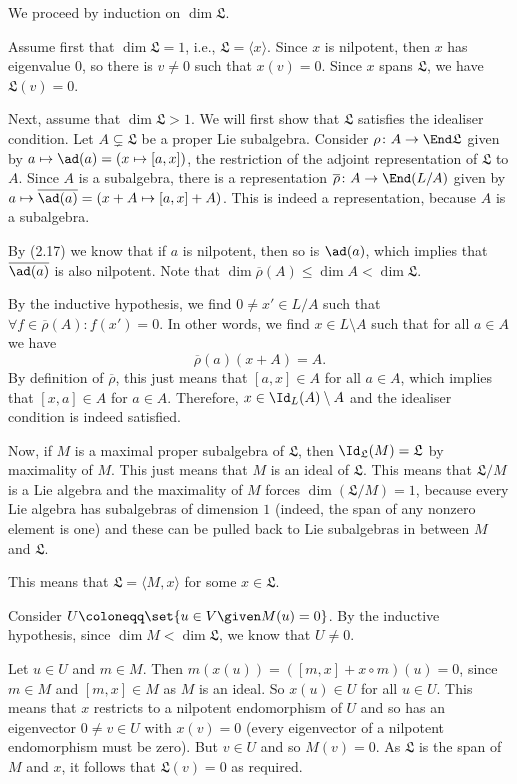 We proceed by induction on $\dim \mathfrak{L}$.

Assume first that $\dim \mathfrak{L} = 1$, i.e., $\mathfrak{L} = \langle x\rangle$.
Since $x$ is nilpotent, then $x$ has eigenvalue $0$, so there is $v\neq 0$ such that
$x(v) = 0$. Since $x$ spans $\mathfrak{L}$, we have $\mathfrak{L}(v) = 0$.

Next, assume that $\dim \mathfrak{L} > 1$. We will first show that $\mathfrak{L}$
satisfies the idealiser condition. Let $A \subsetneq \mathfrak{L}$ be a proper
Lie subalgebra. Consider $\rho\colon A\to \End \mathfrak{L}$ given by
$a\mapsto \ad(a) = (x \mapsto [a, x])$, the restriction of the adjoint representation
of $\mathfrak{L}$ to $A$. Since $A$ is a subalgebra, there is a representation
$\overline{\rho}\colon A\to \End(L/A)$ given by $a\mapsto \overline{\ad(a)} = (x + A\mapsto [a, x] + A)$.
This is indeed a representation, because $A$ is a subalgebra.

By (2.17) we know that if $a$ is nilpotent, then so is $\ad(a)$, which implies that
$\overline{\ad(a)}$ is also nilpotent. Note that $\dim \overline{\rho}(A)\leq\dim A<\dim \mathfrak{L}$.

By the inductive hypothesis, we find $0 \neq x' \in L/A$ such that
$\forall f \in \overline{\rho}(A)\colon f(x') = 0$. In other words, we find
$x \in L\setminus A$ such that for all $a \in A$ we have
\[ \overline{\rho}(a)(x + A) = A. \]
By definition of $\overline{\rho}$, this just means that $[a, x] \in A$
for all $a \in A$, which implies that $[x, a] \in A$ for $a \in A$.
Therefore, $x \in \Id_L(A) \setminus A$ and the idealiser condition is indeed
satisfied.

Now, if $M$ is a maximal proper subalgebra of $\mathfrak{L}$, then
$\Id_{\mathfrak{L}}(M) = \mathfrak{L}$ by maximality of $M$. This just means
that $M$ is an ideal of $\mathfrak{L}$. This means that $\mathfrak{L}/M$ is a Lie
algebra and the maximality of $M$ forces $\dim(\mathfrak{L}/M) = 1$, because every
Lie algebra has subalgebras of dimension $1$ (indeed, the span of any nonzero element
is one) and these can be pulled back to Lie subalgebras in between $M$ and $\mathfrak{L}$.

This means that $\mathfrak{L} = \langle M, x\rangle$ for some $x \in \mathfrak{L}$.

Consider $U\coloneqq \set{u \in V\given M(u) = 0}$. By the inductive hypothesis,
since $\dim M < \dim \mathfrak{L}$, we know that $U\neq 0$.

Let $u \in U$ and $m \in M$. Then $m(x(u)) = ([m, x] + x \circ m)(u) = 0$, since
$m \in M$ and $[m, x] \in M$ as $M$ is an ideal.
So $x(u) \in U$ for all $u \in U$. This means that $x$ restricts to a nilpotent endomorphism
of $U$ and so has an eigenvector $0\neq v \in U$ with $x(v) = 0$ (every eigenvector
of a nilpotent endomorphism must be zero). But $v \in U$ and so $M(v) = 0$.
As $\mathfrak{L}$ is the span of $M$ and $x$, it follows that $\mathfrak{L}(v) = 0$
as required.
